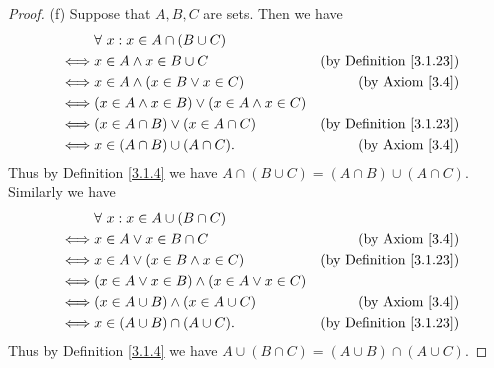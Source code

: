 \begin{proof}{(f)}
    Suppose that \(A, B, C\) are sets.
    Then we have
    \begin{align*}
             & \forall\ x : x \in A \cap (B \cup C)                                                       \\
        \iff & x \in A \land x \in B \cup C                         & \text{(by Definition \ref{3.1.23})} \\
        \iff & x \in A \land (x \in B \lor x \in C)                 & \text{(by Axiom \ref{3.4})}         \\
        \iff & (x \in A \land x \in B) \lor (x \in A \land x \in C)                                       \\
        \iff & (x \in A \cap B) \lor (x \in A \cap C)               & \text{(by Definition \ref{3.1.23})} \\
        \iff & x \in (A \cap B) \cup (A \cap C).                    & \text{(by Axiom \ref{3.4})}
    \end{align*}
    Thus by Definition \ref{3.1.4} we have \(A \cap (B \cup C) = (A \cap B) \cup (A \cap C)\).
    Similarly we have
    \begin{align*}
             & \forall\ x : x \in A \cup (B \cap C)                                                      \\
        \iff & x \in A \lor x \in B \cap C                         & \text{(by Axiom \ref{3.4})}         \\
        \iff & x \in A \lor (x \in B \land x \in C)                & \text{(by Definition \ref{3.1.23})} \\
        \iff & (x \in A \lor x \in B) \land (x \in A \lor x \in C)                                       \\
        \iff & (x \in A \cup B) \land (x \in A \cup C)             & \text{(by Axiom \ref{3.4})}         \\
        \iff & x \in (A \cup B) \cap (A \cup C).                   & \text{(by Definition \ref{3.1.23})}
    \end{align*}
    Thus by Definition \ref{3.1.4} we have \(A \cup (B \cap C) = (A \cup B) \cap (A \cup C)\).
\end{proof}

